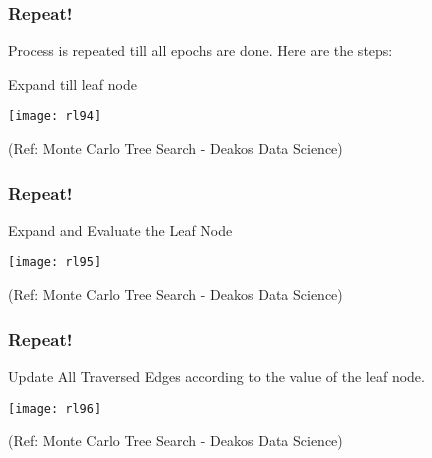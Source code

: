\begin{frame}[fragile]\frametitle{Repeat!}

Process is repeated till all epochs are done. Here are the steps:

Expand till leaf node


\begin{center}
\texttt{[image: rl94]}
\end{center}

{\tiny (Ref: Monte Carlo Tree Search - Deakos Data Science)}

\end{frame}

\begin{frame}[fragile]\frametitle{Repeat!}

Expand and Evaluate the Leaf Node

\begin{center}
\texttt{[image: rl95]}
\end{center}

{\tiny (Ref: Monte Carlo Tree Search - Deakos Data Science)}

\end{frame}

\begin{frame}[fragile]\frametitle{Repeat!}

Update All Traversed Edges according to the value of the leaf node.

\begin{center}
\texttt{[image: rl96]}
\end{center}

{\tiny (Ref: Monte Carlo Tree Search - Deakos Data Science)}

\end{frame}


